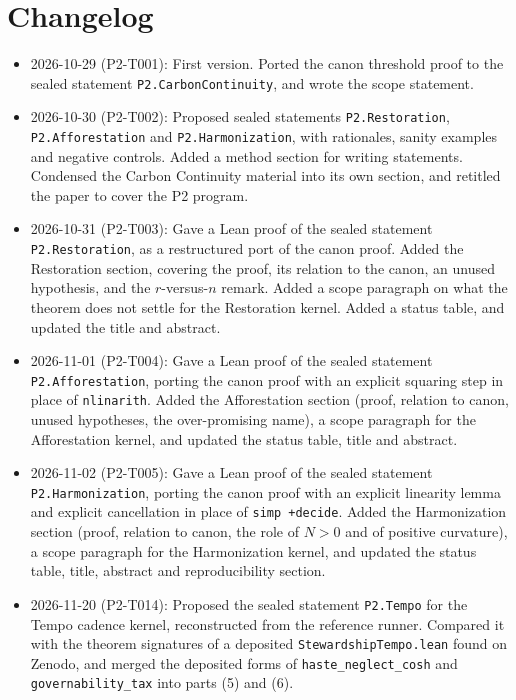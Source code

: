 \documentclass[11pt]{article}
\theoremstyle{definition}
\theoremstyle{remark}
\begin{document}
\section{Changelog}
\begin{itemize}
\item 2026-10-29 (P2-T001): First version. Ported the canon threshold proof to the sealed statement
\texttt{P2.CarbonContinuity}, and wrote the scope statement.
\item 2026-10-30 (P2-T002): Proposed sealed statements \texttt{P2.Restoration}, \texttt{P2.Afforestation} and \texttt{P2.Harmonization},
with rationales, sanity examples and negative controls. Added a method section for writing statements.
Condensed the Carbon Continuity material into its own section, and retitled the paper to cover the P2 program.
\item 2026-10-31 (P2-T003): Gave a Lean proof of the sealed statement \texttt{P2.Restoration}, as a restructured port of the canon
proof. Added the Restoration section, covering the proof, its relation to the canon, an unused hypothesis, and the $r$-versus-$n$ remark.
Added a scope paragraph on what the theorem does not settle for the Restoration kernel. Added a status table, and updated the title and abstract.
\item 2026-11-01 (P2-T004): Gave a Lean proof of the sealed statement \texttt{P2.Afforestation}, porting the canon proof with
an explicit squaring step in place of \texttt{nlinarith}. Added the Afforestation section (proof, relation to canon, unused hypotheses,
the over-promising name), a scope paragraph for the Afforestation kernel, and updated the status table, title and abstract.
\item 2026-11-02 (P2-T005): Gave a Lean proof of the sealed statement \texttt{P2.Harmonization}, porting the canon proof with an
explicit linearity lemma and explicit cancellation in place of \texttt{simp +decide}. Added the Harmonization section (proof,
relation to canon, the role of $N>0$ and of positive curvature), a scope paragraph for the Harmonization kernel, and updated the
status table, title, abstract and reproducibility section.
\item 2026-11-20 (P2-T014): Proposed the sealed statement \texttt{P2.Tempo} for the Tempo cadence kernel, reconstructed from the
reference runner. Compared it with the theorem signatures of a deposited \texttt{StewardshipTempo.lean} found on Zenodo, and
merged the deposited forms of \texttt{haste\_neglect\_cosh} and \texttt{governability\_tax} into parts (5) and (6).

\end{itemize}
\end{document}
